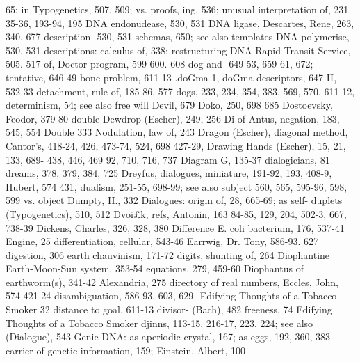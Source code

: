 65; in Typogenetics, 507, 509; vs. proofs,      ing, 536; unusual interpretation of, 231
35-36, 193-94, 195                              DNA endonudease, 530, 531 DNA ligase,
Descartes, Rene, 263, 340, 677 description-     530, 531
schemas, 650; see also templates                DNA polymerise, 530, 531
descriptions: calculus of, 338; restructuring   DNA Rapid Transit Service, 505. 517
of,                                             Doctor program, 599-600. 608 dog-and-
649-53, 659-61, 672; tentative, 646-49          bone problem, 611-13 .doGma 1, doGma
descriptors, 647                                II, 532-33
detachment, rule of, 185-86, 577                dogs, 233, 234, 354, 383, 569, 570, 611-12,
determinism, 54; see also free will Devil,      679 Doko, 250, 698
685                                             Dostoevsky, Feodor, 379-80 double
Dewdrop (Escher), 249, 256 Di of Antus,         negation, 183, 545, 554 Double
333                                             Nodulation, law of, 243 Dragon (Escher),
diagonal method, Cantor's, 418-24, 426,         473-74, 524, 698
427-29,                                         Drawing Hands (Escher), 15, 21, 133, 689-
438, 446, 469                                   92, 710, 716, 737
Diagram G, 135-37 dialogicians, 81              dreams, 378, 379, 384, 725 Dreyfus,
dialogues, miniature, 191-92, 193, 408-9,       Hubert, 574
431,                                            dualism, 251-55, 698-99; see also subject
560, 565, 595-96, 598, 599                      vs. object Dumpty, H., 332
Dialogues: origin of, 28, 665-69; as self-      duplets (Typogenetics), 510, 512 Dvoi£k,
refs,                                           Antonin, 163
84-85, 129, 204, 502-3, 667, 738-39
Dickens, Charles, 326, 328, 380 Difference      E. coli bacterium, 176, 537-41
Engine, 25 differentiation, cellular, 543-46    Earrwig, Dr. Tony, 586-93. 627
digestion, 306                                  earth chauvinism, 171-72
digits, shunting of, 264 Diophantine            Earth-Moon-Sun system, 353-54
equations, 279, 459-60 Diophantus of            earthworm(s), 341-42
Alexandria, 275 directory of real numbers,      Eccles, John, 574
421-24 disambiguation, 586-93, 603, 629-        Edifying Thoughts of a Tobacco Smoker
32 distance to goal, 611-13 divisor-            (Bach), 482
freeness, 74                                    Edifying Thoughts of a Tobacco Smoker
djinns, 113-15, 216-17, 223, 224; see also      (Dialogue), 543
Genie DNA: as aperiodic crystal, 167; as        eggs, 192, 360, 383
carrier of genetic information, 159;            Einstein, Albert, 100
